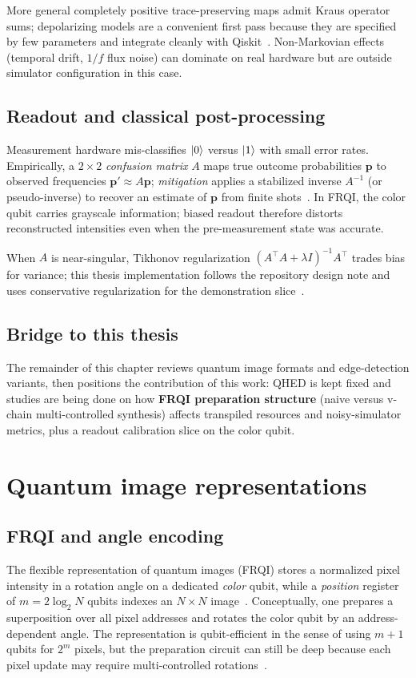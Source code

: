 More general completely positive trace-preserving maps admit Kraus operator sums; depolarizing models are a convenient first pass because they are specified by few parameters and integrate cleanly with Qiskit~\cite{NielsenChuang2010}. Non-Markovian effects (temporal drift, $1/f$ flux noise) can dominate on real hardware but are outside simulator configuration in this case.

\subsection{Readout and classical post-processing}
Measurement hardware mis-classifies $\ket{0}$ versus $\ket{1}$ with small error rates. Empirically, a $2\times 2$ \emph{confusion matrix} $A$ maps true outcome probabilities $\mathbf{p}$ to observed frequencies $\mathbf{p}' \approx A\mathbf{p}$; \emph{mitigation} applies a stabilized inverse $A^{-1}$ (or pseudo-inverse) to recover an estimate of $\mathbf{p}$ from finite shots~\cite{Mu2025GuidedImageFiltering}. In FRQI, the color qubit carries grayscale information; biased readout therefore distorts reconstructed intensities even when the pre-measurement state was accurate.

When $A$ is near-singular, Tikhonov regularization $(A^\top A + \lambda I)^{-1}A^\top$ trades bias for variance; this thesis implementation follows the repository design note and uses conservative regularization for the demonstration slice~\cite{Mu2025GuidedImageFiltering}.

\subsection{Bridge to this thesis}
The remainder of this chapter reviews quantum image formats and edge-detection variants, then positions the contribution of this work: QHED is kept fixed and studies are being done on how \textbf{FRQI preparation structure} (naive versus v-chain multi-controlled synthesis) affects transpiled resources and noisy-simulator metrics, plus a readout calibration slice on the color qubit.

\section{Quantum image representations}
\subsection{FRQI and angle encoding}
The flexible representation of quantum images (FRQI) stores a normalized pixel intensity in a rotation angle on a dedicated \emph{color} qubit, while a \emph{position} register of $m=2\log_2 N$ qubits indexes an $N\times N$ image~\cite{Le2011FRQI}. Conceptually, one prepares a superposition over all pixel addresses and rotates the color qubit by an address-dependent angle. The representation is qubit-efficient in the sense of using $m+1$ qubits for $2^m$ pixels, but the preparation circuit can still be deep because each pixel update may require multi-controlled rotations~\cite{Iliyasu2013FRQIroadmap}.

